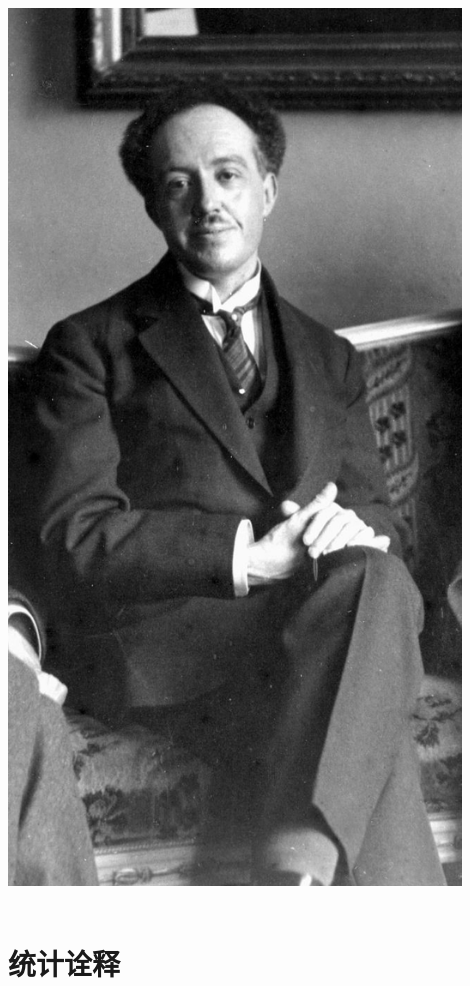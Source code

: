 \begin{frame}
\begin{columns}
\begin{column}[t]{0.46\linewidth}
\begin{center}
                    \includegraphics[width=0.9\textwidth]{figs/2021-12-03-18-00-05.png} \\
                \end{center} 
            \end{column}
        \end{columns}

\end{frame}

\section{统计诠释}

